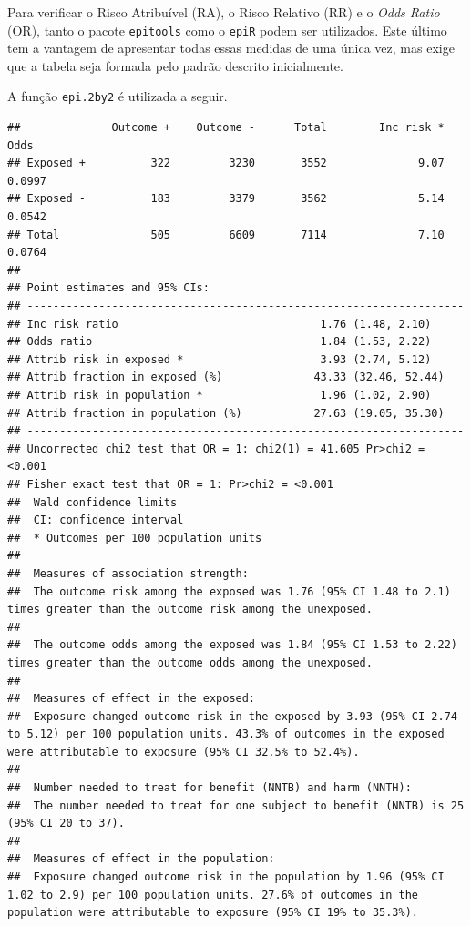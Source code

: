 \documentclass[
]{book}
\newenvironment{Shaded}{\begin{snugshade}}{\end{snugshade}}
\newcommand{\FunctionTok}[1]{\textcolor[rgb]{0.00,0.00,0.00}{#1}}
\newcommand{\NormalTok}[1]{#1}
\newcommand{\SpecialCharTok}[1]{\textcolor[rgb]{0.00,0.00,0.00}{#1}}
\begin{document}
Para verificar o Risco Atribuível (RA), o Risco Relativo (RR) e o \emph{Odds Ratio} (OR), tanto o pacote \texttt{epitools} como o \texttt{epiR} podem ser utilizados. Este último tem a vantagem de apresentar todas essas medidas de uma única vez, mas exige que a tabela seja formada pelo padrão descrito inicialmente.

A função \texttt{epi.2by2} é utilizada a seguir.

\begin{Shaded}
\end{Shaded}

\begin{verbatim}
##              Outcome +    Outcome -      Total        Inc risk *        Odds
## Exposed +          322         3230       3552              9.07      0.0997
## Exposed -          183         3379       3562              5.14      0.0542
## Total              505         6609       7114              7.10      0.0764
## 
## Point estimates and 95% CIs:
## -------------------------------------------------------------------
## Inc risk ratio                               1.76 (1.48, 2.10)
## Odds ratio                                   1.84 (1.53, 2.22)
## Attrib risk in exposed *                     3.93 (2.74, 5.12)
## Attrib fraction in exposed (%)              43.33 (32.46, 52.44)
## Attrib risk in population *                  1.96 (1.02, 2.90)
## Attrib fraction in population (%)           27.63 (19.05, 35.30)
## -------------------------------------------------------------------
## Uncorrected chi2 test that OR = 1: chi2(1) = 41.605 Pr>chi2 = <0.001
## Fisher exact test that OR = 1: Pr>chi2 = <0.001
##  Wald confidence limits
##  CI: confidence interval
##  * Outcomes per 100 population units 
## 
##  Measures of association strength:
##  The outcome risk among the exposed was 1.76 (95% CI 1.48 to 2.1) times greater than the outcome risk among the unexposed. 
##  
##  The outcome odds among the exposed was 1.84 (95% CI 1.53 to 2.22) times greater than the outcome odds among the unexposed. 
## 
##  Measures of effect in the exposed:
##  Exposure changed outcome risk in the exposed by 3.93 (95% CI 2.74 to 5.12) per 100 population units. 43.3% of outcomes in the exposed were attributable to exposure (95% CI 32.5% to 52.4%). 
## 
##  Number needed to treat for benefit (NNTB) and harm (NNTH):
##  The number needed to treat for one subject to benefit (NNTB) is 25 (95% CI 20 to 37). 
## 
##  Measures of effect in the population:
##  Exposure changed outcome risk in the population by 1.96 (95% CI 1.02 to 2.9) per 100 population units. 27.6% of outcomes in the population were attributable to exposure (95% CI 19% to 35.3%).
\end{verbatim}
\end{document}
